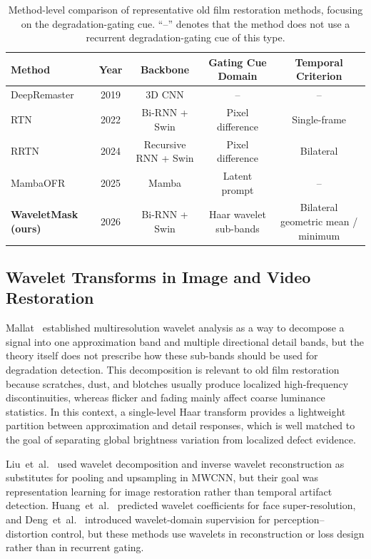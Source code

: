 \begin{table}[H]
\caption{Method-level comparison of representative old film restoration methods, focusing on the degradation-gating cue. ``--'' denotes that the method does not use a recurrent degradation-gating cue of this type.\label{tab:method_comparison}}
\footnotesize
\begin{tabularx}{\textwidth}{lccCC}
\toprule
\textbf{Method} & \textbf{Year} & \textbf{Backbone} & \textbf{Gating Cue Domain} & \textbf{Temporal Criterion} \\
\midrule
DeepRemaster~\cite{iizuka2019deepremaster} & 2019 & 3D CNN & -- & -- \\
RTN~\cite{rtn2022} & 2022 & Bi-RNN + Swin & Pixel difference & Single-frame \\
RRTN~\cite{rrtn2024} & 2024 & Recursive RNN + Swin & Pixel difference & Bilateral \\
MambaOFR~\cite{mao2025mambaofr} & 2025 & Mamba & Latent prompt & -- \\
\textbf{WaveletMask (ours)} & 2026 & Bi-RNN + Swin & Haar wavelet sub-bands & Bilateral geometric mean / minimum \\
\bottomrule
\end{tabularx}
\normalsize
\end{table}

\subsection{Wavelet Transforms in Image and Video Restoration}

Mallat~\cite{mallat1989theory} established multiresolution wavelet analysis as a way to decompose a signal into one approximation band and multiple directional detail bands, but the theory itself does not prescribe how these sub-bands should be used for degradation detection. This decomposition is relevant to old film restoration because scratches, dust, and blotches usually produce localized high-frequency discontinuities, whereas flicker and fading mainly affect coarse luminance statistics. In this context, a single-level Haar transform provides a lightweight partition between approximation and detail responses, which is well matched to the goal of separating global brightness variation from localized defect evidence.

Liu~et~al.~\cite{liu2018mwcnn} used wavelet decomposition and inverse wavelet reconstruction as substitutes for pooling and upsampling in MWCNN, but their goal was representation learning for image restoration rather than temporal artifact detection. Huang~et~al.~\cite{huang2017wavelet} predicted wavelet coefficients for face super-resolution, and Deng~et~al.~\cite{deng2019swd} introduced wavelet-domain supervision for perception--distortion control, but these methods use wavelets in reconstruction or loss design rather than in recurrent gating.

